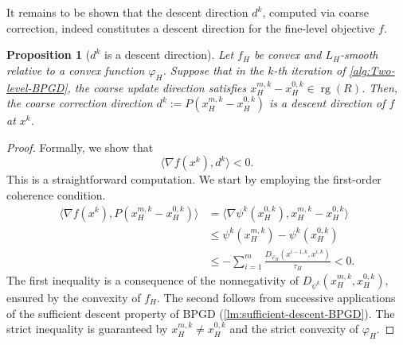 \documentclass[11pt,reqno]{amsart}
\numberwithin{equation}{section}
\numberwithin{figure}{section}
\theoremstyle{plain}
\newtheorem{proposition}[theorem]{Proposition}
\theoremstyle{definition}
\newcommand{\Fc}{\mathcal{F}}
\newcommand{\la}{\langle}
\newcommand{\ra}{\rangle}
\newcommand{\vphi}{\varphi}
\newcommand{\df}{\nabla f}
\newcommand{\dFc}{\nabla \Fc}
\DeclareMathOperator{\rg}{rg}
\begin{document}
It remains to be shown that the descent direction $d^k$, computed via coarse correction, indeed constitutes a descent direction for the fine-level objective $f$.
\begin{proposition}[$d^k$ is a descent direction] \label{prop:dk-is-a-descent-direction}
    Let $f_H$ be convex and $L_H$-smooth relative to a convex function $\vphi_H$. Suppose that in the 
    $k$-th iteration of \cref{alg:Two-level-BPGD}, the coarse update direction satisfies $x_H^{m,k}-x_H^{0,k} \in \rg(R)$. Then, the coarse correction direction $d^k := P(x_H^{m,k} - x_H^{0,k})$ is a descent direction of $f$ at $x^k$. 
\end{proposition}
\begin{proof}
    Formally, we show that
    \begin{equation}
        \la \df(x^k), d^k \ra < 0.
    \end{equation}
    This is a straightforward computation. We start by employing the first-order coherence condition.
    \begin{align}
        \la \df(x^k), P(x_H^{m,k}-x_H^{0,k}) \ra &= \la \nabla \psi^k(x^{0,k}_H), x^{m,k}_H - x^{0,k}_H \ra \\
        &\leq \psi^k(x^{m,k}_H) - \psi^k(x^{0,k}_H) \\ &\leq -\sum_{i = 1}^m \frac{D_{\vphi_H}(x^{i-1,k}, x^{i,k})}{\tau_H} < 0. \label{eq:coarse-sufficient-descent-Armijo}
    \end{align}
    The first inequality is a consequence of the nonnegativity of $D_{\psi^k}(x^{m,k}_H,x^{0,k}_H)$, ensured by the convexity of $f_H$. The second follows from successive applications of the sufficient descent property of BPGD (\cref{lm:sufficient-descent-BPGD}). The strict inequality is guaranteed by $x_H^{m,k} \neq x_H^{0,k}$ and the strict convexity of $\vphi_H$. 
\end{proof}
\end{document}
